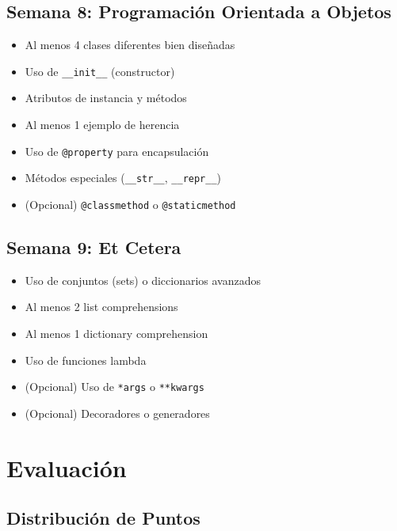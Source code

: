 \documentclass[12pt,a4paper]{article}
\begin{document}
\subsection{Semana 8: Programación Orientada a Objetos}
\begin{itemize}
    \item Al menos 4 clases diferentes bien diseñadas
    \item Uso de \texttt{\_\_init\_\_} (constructor)
    \item Atributos de instancia y métodos
    \item Al menos 1 ejemplo de herencia
    \item Uso de \texttt{@property} para encapsulación
    \item Métodos especiales (\texttt{\_\_str\_\_}, \texttt{\_\_repr\_\_})
    \item (Opcional) \texttt{@classmethod} o \texttt{@staticmethod}
\end{itemize}

\subsection{Semana 9: Et Cetera}
\begin{itemize}
    \item Uso de conjuntos (sets) o diccionarios avanzados
    \item Al menos 2 list comprehensions
    \item Al menos 1 dictionary comprehension
    \item Uso de funciones lambda
    \item (Opcional) Uso de \texttt{*args} o \texttt{**kwargs}
    \item (Opcional) Decoradores o generadores
\end{itemize}

\section{Evaluación}

\subsection{Distribución de Puntos}
\end{document}
